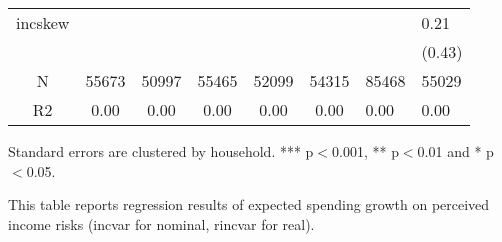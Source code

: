 \documentclass[12pt,notitlepage,onecolumn,aps,pra]{article}
\begin{document}
\begin{table}[p]
\begin{adjustbox}{width={0.9\textwidth}}
\begin{threeparttable}
\begin{tabular}{ccccccll}
          incskew   &            &             &              &               &                &                 &             0.21 \\
          &            &             &              &               &                &                 &           (0.43) \\
          \hline 
N         &      55673 &       50997 &        55465 &         52099 &          54315 &           85468 &            55029 \\
R2        &       0.00 &        0.00 &         0.00 &          0.00 &           0.00 &            0.00 &             0.00 \\
\hline 
\end{tabular}
\begin{tablenotes}\item Standard errors are clustered by household. *** p$<$0.001, ** p$<$0.01 and * p$<$0.05. 
\item This table reports regression results of expected spending growth on perceived income risks (incvar for nominal, rincvar for real).
\end{tablenotes}
\end{threeparttable}
\end{adjustbox}
\end{table}       %
    
    



    
\end{document}
